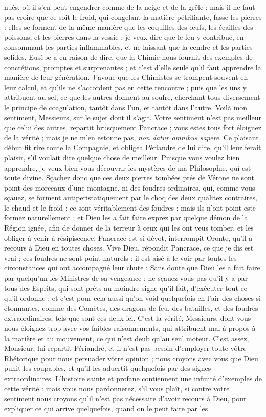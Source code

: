 \documentclass[a4paper, 11pt, oneside, polutonikogreek, french]{article}
\begin{document}
nués, où il s'en peut engendrer comme de la neige et de la grêle : mais il ne faut pas croire que ce soit le froid, qui congelant la matière pétrifiante, fasse les pierres : elles se forment de la même manière que les coquilles des œufs, les écailles des poissons, et les pierres dans la vessie : je veux dire que le feu y contribué, en consommant les parties inflammables, et ne laissant que la cendre et les parties solides. Eusèbe a eu raison de dire, que la Chimie nous fournit des exemples de concrétions, promptes et surprenantes ; et c'est d'elle seule qu'il faut apprendre la manière de leur génération. J'avoue que les Chimistes se trompent souvent en leur calcul, et qu'ils ne s'accordent pas en cette rencontre ; puis que les uns y attribuent au sel, ce que les autres donnent au soufre, cherchant tous diversement le principe de coagulation, tantôt dans l'un, et tantôt dans l'autre. Voilà mon sentiment, Messieurs, sur le sujet dont il s'agit. Votre sentiment n'est pas meilleur que celui des autres, repartit brusquement Pancrace ; vous estes tous fort éloignez de la vérité ; mais je ne m'en estonne pas, \emph{non datur omnibus sapere}. Ce plaisant début fit rire toute la Compagnie, et obligea Périandre de lui dire, qu'il leur ferait plaisir, s'il voulait dire quelque chose de meilleur. Puisque vous voulez bien apprendre, je veux bien vous découvrir les mystères de ma Philosophie, qui est toute divine. Sçachez donc que ces deux pierres tombées prés de Vérone ne sont point des morceaux d'une montagne, ni des foudres ordinaires, qui, comme vous sçauez, se forment autiperistatiquement par le choq des deux qualitez contraires, le chaud et le froid : ce sont véritablement des foudres ; mais ils n'ont point este formez naturellement ; et Dieu les a fait faire exprez par quelque démon de la Région ignée, afin de donner de la terreur à ceux qui les ont veus tomber, et les obliger à venir à résipiscence. Pancrace est si dévot, interrompit Oronte, qu'il a recours à Dieu en toutes choses. Vive Dieu, répondit Pancrace, ce que je dis est vrai ; ces foudres ne sont point naturels : il est aisé à le voir par toutes les circonstances qui ont accompagné leur chute : Sans doute que Dieu les a fait faire par quelqu'un les Ministres de sa vengeance ; ne sçauez-vous pas qu'il y a par tous des Esprits, qui sont prêts au moindre signe qu'il fait, d'exécuter tout ce qu'il ordonne ; et c'est pour cela aussi qu'on void quelquefois en l'air des choses si étonnantes, comme des Comètes, des dragons de feu, des batailles, et des foudres extraordinaires, tels que sont ces deux ici. C'est la vérité, Messieurs, dont vous nous éloignez trop avec vos faibles raisonnements, qui attribuent mal à propos à la matière et au mouvement, ce qui n'est deub qu'au seul moteur. C'est assez, Monsieur, lui repartit Périandre, et il n'est pas besoin d'employer toute vôtre Rhétorique pour nous persuader vôtre opinion ; nous croyons avec vous que Dieu punit les coupables, et qu'il les aduertit quelquefois par des signes extraordinaires. L'histoire sainte et profane contiennent une infinité d'exemples de cette vérité : mais vous nous pardonnerez, s'il vous plaît, si contre votre sentiment nous croyons qu'il n'est pas nécessaire d'avoir recours à Dieu, pour expliquer ce qui arrive quelquefois, quand on le peut faire par les 
\end{document}
